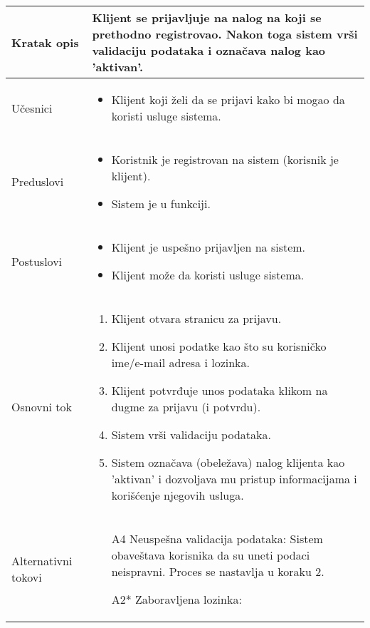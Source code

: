 \documentclass[../main.tex]{subfiles}
\begin{document}
\begin{longtable}{| p{} | p{} |} 
\hline
    Kratak opis & Klijent se prijavljuje na nalog na koji se prethodno registrovao. Nakon toga sistem vrši validaciju podataka i označava nalog kao 'aktivan'.\\
\hline
    Učesnici & \begin{itemize}
        \item Klijent koji želi da se prijavi kako bi mogao da koristi usluge sistema.
    \end{itemize} \\
\hline
   Preduslovi & \begin{itemize}
    \item Koristnik je registrovan na sistem (korisnik je klijent).
    \item Sistem je u funkciji.
   \end{itemize}
   \\
\hline  
    Postuslovi & \begin{itemize}
        \item Klijent je uspešno prijavljen na sistem.
        \item Klijent može da koristi usluge sistema.
    \end{itemize} \\
\hline
    Osnovni tok & \begin{enumerate}
    \item Klijent otvara stranicu za prijavu.
	\item Klijent unosi podatke kao što su korisničko ime/e-mail adresa i lozinka.
	\item Klijent potvrđuje unos podataka klikom na dugme za prijavu (i potvrdu).
	\item Sistem vrši validaciju podataka.
	\item Sistem označava (obeležava) nalog klijenta kao 'aktivan' i dozvoljava mu pristup informacijama i korišćenje njegovih usluga.
	\end{enumerate}\\
\hline
    Alternativni tokovi & \begin{itemize}
    \item [A4] Neuspešna validacija podataka: Sistem obaveštava korisnika da su uneti podaci neispravni. Proces se nastavlja u koraku 2.
    \item [A2*] Zaboravljena lozinka: \begin{enumerate}

\end{enumerate}
\end{itemize}
\end{longtable}
\end{document}
